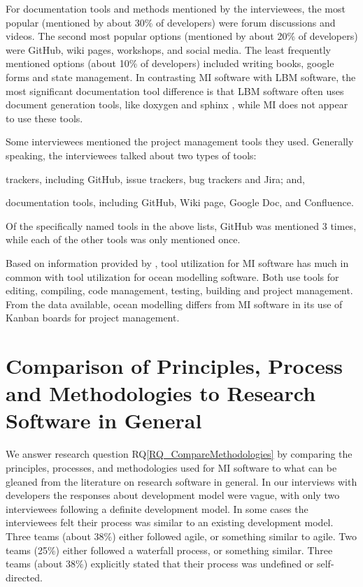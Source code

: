 \documentclass[final, 3p, times, authoryear]{elsarticle}
\newcommand{\rqref}[1]{RQ\ref{#1}}
\begin{document}
For documentation tools and methods mentioned by the interviewees, the most
popular (mentioned by about 30\% of developers) were forum discussions and
videos.  The second most popular options (mentioned by about 20\% of developers)
were GitHub, wiki pages, workshops, and social media. The least frequently
mentioned options (about 10\% of developers) included writing books, google
forms and state management.  In contrasting MI software with LBM software, the
most significant documentation tool difference is that LBM software often uses
document generation tools, like doxygen and sphinx \citep{Michalski2021}, while
MI does not appear to use these tools. 

Some interviewees mentioned the project management tools they used. Generally
speaking, the interviewees talked about two types of tools:
\begin{inparaenum}[i)]
\item trackers, including GitHub, issue trackers, bug trackers and Jira; and,
\item documentation tools, including GitHub, Wiki page, Google Doc, and
Confluence.
\end{inparaenum}
Of the specifically named tools in the above lists, GitHub was mentioned 3
times, while each of the other tools was only mentioned once.

Based on information provided by \citet{JungEtAl2022}, tool utilization for MI
software has much in common with tool utilization for ocean modelling software.
Both use tools for editing, compiling, code management, testing, building and
project management.  From the data available, ocean modelling differs from MI
software in its use of Kanban boards for project management.

\section{Comparison of Principles, Process and Methodologies to Research Software in General} \label{Sec_CompareMethodologies}

We answer research question \rqref{RQ_CompareMethodologies} by comparing the
principles, processes, and methodologies used for MI software to what can be
gleaned from the literature on research software in general. In our interviews
with developers the responses about development model were vague, with only two
interviewees following a definite development model. In some cases the
interviewees felt their process was similar to an existing development model.
Three teams (about 38\%) either followed agile, or something similar to agile.
Two teams (25\%) either followed a waterfall process, or something similar.
Three teams (about 38\%) explicitly stated that their process was undefined or
self-directed.
\end{document}
